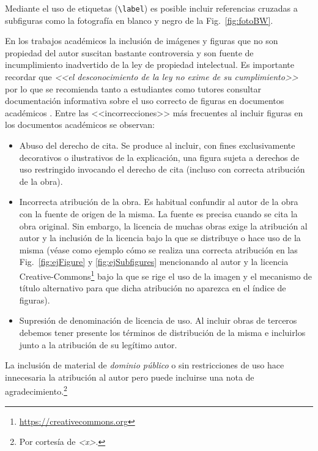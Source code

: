 Mediante el uso de etiquetas (\texttt{\textbackslash label}) es posible incluir referencias cruzadas a subfiguras como la fotografía en blanco y negro de la Fig.~\ref{fig:fotoBW}.

En los trabajos académicos la inclusión de imágenes y figuras que no son propiedad del autor suscitan bastante controversia y son fuente de incumplimiento inadvertido de la ley de propiedad intelectual. Es importante recordar que \emph{<<el desconocimiento de la ley no exime de su cumplimiento>>} por lo que se recomienda tanto a estudiantes como tutores consultar documentación informativa sobre el uso correcto de figuras en documentos académicos \cite{unican18}. Entre las <<incorrecciones>> más frecuentes al incluir figuras en los documentos académicos se observan:
\begin{itemize}
\item Abuso del derecho de cita. Se produce al incluir, con fines exclusivamente decorativos o ilustrativos de la explicación, una figura sujeta a derechos de uso restringido invocando el derecho de cita (incluso con correcta atribución de la obra).

\item Incorrecta atribución de la obra. Es habitual confundir al autor de la obra con la fuente de origen de la misma. La fuente es precisa cuando se cita la obra original. Sin embargo, la licencia de muchas obras exige la atribución al autor y la inclusión de la licencia bajo la que se distribuye o hace uso de la misma (véase como ejemplo cómo se realiza una correcta atribución en las Fig.~\ref{fig:ejFigure} y \ref{fig:ejSubfigures} mencionando al autor y la licencia Creative-Commons\footnote{\url{https://creativecommons.org}} bajo la que se rige el uso de la imagen y el mecanismo de título alternativo para que dicha atribución no aparezca en el índice de figuras).

\item Supresión de denominación de licencia de uso. Al incluir obras de terceros debemos tener presente los términos de distribución de la misma e incluirlos junto a la atribución de su legítimo autor.
\end{itemize}

La inclusión de material de \emph{dominio público} o sin restricciones de uso hace innecesaria la atribución al autor pero puede incluirse una nota de agradecimiento.\footnote{Por cortesía de \emph{<x>}.}

